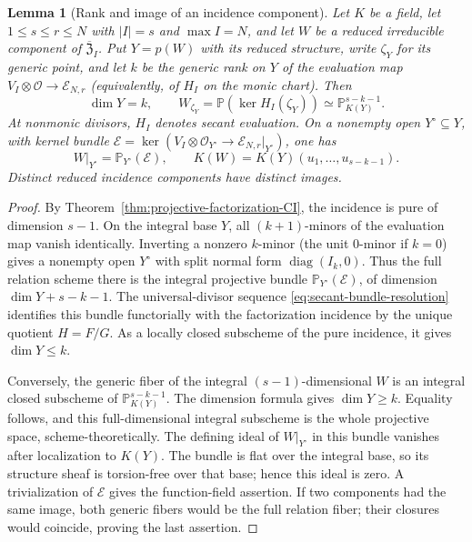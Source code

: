 \documentclass[10pt,fleqn]{article}
\numberwithin{equation}{section}
\newtheorem{lemma}[theorem]{Lemma}
\newcommand{\PP}{\mathbb P}
\newcommand{\cE}{\mathcal E}
\begin{document}
\begin{lemma}[Rank and image of an incidence component]
\label{lem:profile-rank-image}
Let $K$ be a field, let $1\le s\le r\le N$ with $|I|=s$ and $\max I=N$,
and let $W$ be a reduced irreducible
component of $\overline{\mathfrak Z}_I$.  Put $Y=p(W)$ with its reduced
structure, write $\zeta_Y$ for its generic point, and let $k$ be the generic rank on $Y$ of the evaluation map
$V_I\otimes\mathcal O\to\cE_{N,r}$ (equivalently, of $H_I$ on the monic
chart).  Then
\begin{equation}\label{eq:profile-rank-image}
 \dim Y=k,\qquad
 W_{\zeta_Y}=\PP(\ker H_I(\zeta_Y))
 \simeq\PP^{s-k-1}_{K(Y)}.
\end{equation}
At nonmonic divisors, $H_I$ denotes secant evaluation.  On a nonempty
open $Y^\circ\subseteq Y$, with kernel bundle
$\mathcal E=\ker(V_I\otimes\mathcal O_{Y^\circ}\to
\cE_{N,r}|_{Y^\circ})$, one has
\[
 W|_{Y^\circ}=\PP_{Y^\circ}(\mathcal E),\qquad
 K(W)=K(Y)(u_1,\ldots,u_{s-k-1}).
\]
Distinct reduced incidence components have distinct images.
\end{lemma}

\begin{proof}
By Theorem~\ref{thm:projective-factorization-CI}, the incidence is pure of
dimension $s-1$.  On the integral base $Y$, all $(k+1)$-minors of
the evaluation map vanish identically.  Inverting a nonzero $k$-minor
(the unit $0$-minor if $k=0$) gives a nonempty open $Y^\circ$ with split
normal form $\operatorname{diag}(I_k,0)$.  Thus the full relation
scheme there is the integral projective bundle
$\PP_{Y^\circ}(\mathcal E)$, of dimension $\dim Y+s-k-1$.
The universal-divisor sequence \eqref{eq:secant-bundle-resolution}
identifies this bundle functorially with the factorization incidence
by the unique quotient $H=F/G$.  As a locally closed subscheme of
the pure incidence, it gives $\dim Y\le k$.

Conversely, the generic fiber of the integral $(s-1)$-dimensional
$W$ is an integral closed subscheme of $\PP^{s-k-1}_{K(Y)}$.
The dimension formula gives $\dim Y\ge k$.  Equality follows,
and this full-dimensional integral subscheme is the whole projective
space, scheme-theoretically.
The defining ideal of $W|_{Y^\circ}$ in this bundle vanishes after
localization to $K(Y)$.  The bundle is flat over the integral base, so its
structure sheaf is torsion-free over that base; hence this ideal is zero.
A trivialization of $\mathcal E$ gives the function-field assertion.  If two components had the same image,
both generic fibers would be the full relation fiber; their closures
would coincide, proving the last assertion.
\end{proof}
\end{document}
